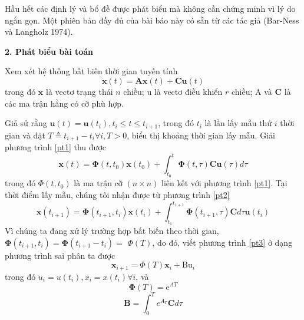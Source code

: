 \documentclass[12pt,a4paper]{article}
\begin{document}
Hầu hết các định lý và bổ đề được phát biểu mà không cần chứng minh vì lý do ngắn gọn. Một phiên bản đầy đủ của bài báo này có sẵn từ các tác giả (Bar-Ness và Langholz 1974).


\textbf{2. Phát biểu bài toán}

Xem xét hệ thống bất biến thời gian tuyến tính
\begin{equation}\tag{1}\label{pt1}
\dot{\mathbf{x}}(t)=\mathbf{A} \mathbf{x}(t)+\mathbf{C u}(t)
\end{equation}
trong đó $\mathbf{x}$ là vectơ trạng thái $n$ chiều; $\mathrm{u}$ là  vectơ điều khiển $r$ chiều; A và $\mathbf{C}$ là các ma trận hằng có cỡ phù hợp.

Giả sử rằng $\mathbf{u}(t)=\mathbf{u}\left(t_i\right), t_i \leqslant t \leqslant t_{i+1}$, trong đó $t_i$ là lần lấy mẫu thứ $i$ thời gian và đặt $T \triangleq t_{i+1}-t_i \forall i, T>0$, biểu thị khoảng thời gian lấy mẫu. Giải phương trình \eqref{pt1} thu được
\begin{equation}\tag{2}\label{pt2}
\mathbf{x}(t)=\boldsymbol{\Phi}\left(t, t_0\right) \mathbf{x}\left(t_0\right)+\int_{t_0}^t \boldsymbol{\Phi} (t, \tau) \mathbf{C u}(\tau) d \tau
\end{equation}
trong đó $\Phi\left(t, t_0\right)$ là ma trận cỡ $(n \times n)$ liên kết với phương trình \eqref{pt1}. Tại thời điểm lấy mẫu, chúng tôi nhận được từ phương trình \eqref{pt2}
\begin{equation}\tag{3}\label{pt3}
\mathbf{x}\left(t_{i+1}\right)=\boldsymbol{\Phi}\left(t_{i+1}, t_i\right) \mathbf{x}\left(t_i\right) +\int_{t_1}^{t_{1+1}} \boldsymbol{\Phi}\left(t_{i+1}, \tau\right) \mathbf{C} d \tau \mathbf{u}(t_i)
\end{equation}
Vì chúng ta đang xử lý trường hợp bất biến theo thời gian, $\boldsymbol{\Phi}\left(t_{i+1}, t_i\right)=\boldsymbol{\Phi}\left(t_{i+1}-t_i \right)=$ $\Phi(T)$, do đó, viết phương trình \eqref{pt3} ở dạng phương trình sai phân ta được
\begin{equation}\tag{4}\label{pt4}
\mathbf{x}_{i+1}=\Phi(T) \mathbf{x}_i+\mathrm{Bu}_i
\end{equation}
trong đó $u_i=u\left(t_i\right), x_i=x\left(t_i\right) \forall i$, và
\begin{equation}\tag{5}\label{pt5}
	\boldsymbol{\Phi}(T)=\mathrm{e}^{A T}
\end{equation}
\begin{equation}\tag{6}\label{pt6}
	\mathbf{B}=\int_0^T e^{A_T} \mathbf{C} d \tau
\end{equation}
\end{document}
